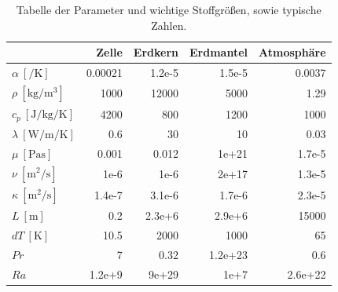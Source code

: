 \documentclass[12pt,a4paper,titlepage,headinclude]{scrartcl}
\numberwithin{equation}{subsection}
\begin{document}
\begin{table}
\centering
\begin{tabular}{|l|rrrr|}
\hline
                                              & Zelle       & Erdkern    & Erdmantel &Atmosphäre \\
\hline\hline
$\alpha~[\si{\per\kelvin}]$                   & 0.00021     & 1.2e-5     & 1.5e-5    & 0.0037    \\
$\rho~[\si{\kilo\gram\per\cubic\meter}]$      & 1000        & 12000      & 5000      & 1.29      \\
 $c_p~[\si{\joule\per\kilo\gram\per\kelvin}]$ & 4200        & 800        & 1200      & 1000      \\
 $\lambda~[\si{\watt\per\meter\per\kelvin}]$  & 0.6         & 30         & 10        & 0.03      \\
 $\mu~[\si{\pascal\second}]$                  & 0.001       & 0.012      & 1e+21     & 1.7e-5    \\
 $\nu~[\si{\square\meter\per\second}]$        & 1e-6        & 1e-6       & 2e+17     & 1.3e-5    \\
 $\kappa~[\si{\square\meter\per\second}]$     & 1.4e-7      & 3.1e-6     & 1.7e-6    & 2.3e-5    \\
 $L~[\si{\meter}]$                            & 0.2         & 2.3e+6     & 2.9e+6    & 15000     \\
 $dT~[\si{\kelvin}]$                          & 10.5        & 2000       & 1000      & 65        \\
 $Pr$                                         & 7           & 0.32       & 1.2e+23   & 0.6       \\
 $Ra$                                         & 1.2e+9      & 9e+29      & 1e+7      & 2.6e+22   \\
\hline
\end{tabular}
\caption{Tabelle der Parameter und wichtige Stoffgrößen, sowie typische Zahlen.}
\label{tab:par}
\end{table}
\end{document}
